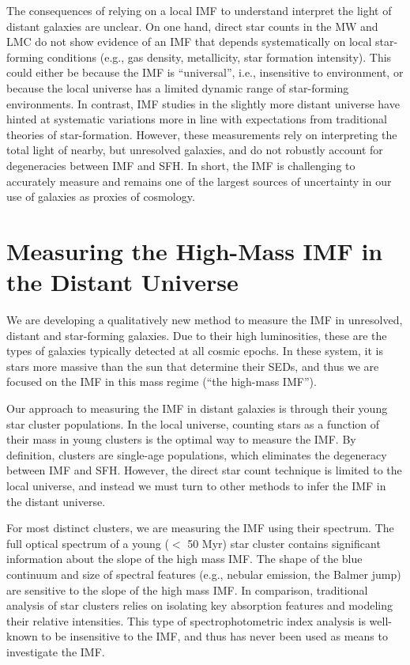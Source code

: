 \documentclass[11pt,preprint]{aastex}
\begin{document}
The consequences of relying on a local IMF to understand interpret the light of distant galaxies are unclear.  On one hand, direct star counts in the MW and LMC do not show evidence of an IMF that depends systematically on local star-forming conditions (e.g., gas density, metallicity, star formation intensity). This could either be because the IMF is ``universal'', i.e., insensitive to environment, or because the local universe has a limited dynamic range of star-forming environments.  In contrast, IMF studies in the slightly more distant universe have hinted at systematic variations more in line with expectations from traditional theories of star-formation.  However, these measurements rely on interpreting the total light of nearby, but unresolved galaxies, and do not robustly account for degeneracies between IMF and SFH.  In short, the IMF is challenging to accurately measure and remains one of the largest sources of uncertainty in our use of galaxies as proxies of cosmology.


\section{Measuring the High-Mass IMF in the Distant Universe}

We are developing a qualitatively new method to measure the IMF in unresolved, distant and star-forming galaxies.  Due to their high luminosities, these are the types of galaxies typically detected at all cosmic epochs.  In these system, it is stars more massive than the sun that determine their SEDs, and thus we are focused on the IMF in this mass regime (``the high-mass IMF'').

Our approach to measuring the IMF in distant galaxies is through their young star cluster populations. In the local universe, counting stars as a function of their mass in young clusters is the optimal way to measure the IMF.  By definition, clusters are single-age populations, which eliminates the degeneracy between IMF and SFH.  However, the direct star count technique is limited to the local universe, and instead we must turn to other methods to infer the IMF in the distant universe.  

For most distinct clusters, we are measuring the IMF using their spectrum.  The full optical spectrum of a young ($<$ 50 Myr) star cluster contains significant information about the slope of the high mass IMF.  The shape of the blue continuum and size of spectral features (e.g., nebular emission, the Balmer jump) are sensitive to the slope of the high mass IMF.  In comparison, traditional analysis of star clusters relies on isolating key absorption features and modeling their relative intensities.  This type of spectrophotometric index analysis is well-known to be insensitive to the IMF\citep[e.g.,][]{kol08}, and thus has never been used as means to investigate the IMF.  
\end{document}
